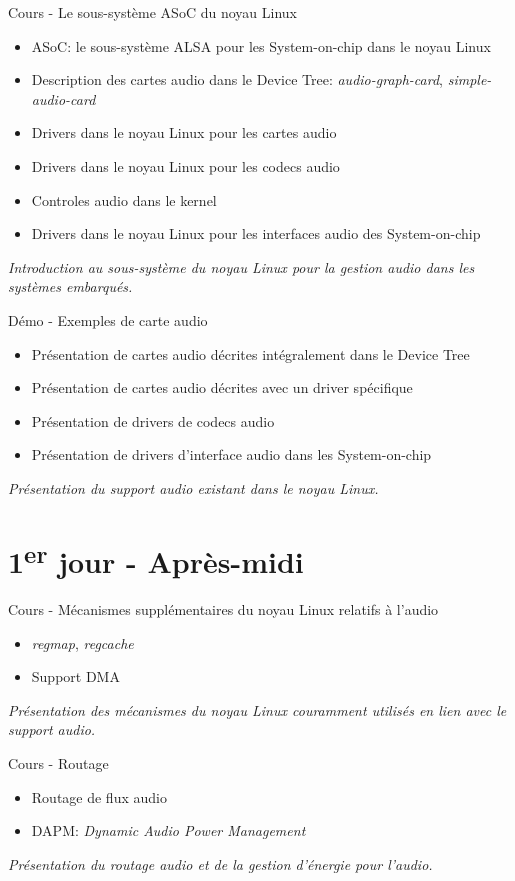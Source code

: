 \documentclass[a4paper,12pt,obeyspaces,spaces,hyphens]{article}
\begin{document}
\feagendatwocolumn
{Cours - Le sous-système ASoC du noyau Linux}
{
  \begin{itemize}
  \item ASoC: le sous-système ALSA pour les System-on-chip dans le noyau Linux
  \item Description des cartes audio dans le Device Tree: {\em
      audio-graph-card}, {\em simple-audio-card}
  \item Drivers dans le noyau Linux pour les cartes audio
  \item Drivers dans le noyau Linux pour les codecs audio
  \item Controles audio dans le kernel
  \item Drivers dans le noyau Linux pour les interfaces audio des
    System-on-chip
  \end{itemize}
  \vspace{0.5em}
  {\em Introduction au sous-système du noyau Linux pour la gestion audio dans les systèmes embarqués.}
}
{Démo - Exemples de carte audio}
{
  \begin{itemize}
  \item Présentation de cartes audio décrites intégralement dans le Device Tree
  \item Présentation de cartes audio décrites avec un driver spécifique
  \item Présentation de drivers de codecs audio
  \item Présentation de drivers d'interface audio dans les
    System-on-chip
  \end{itemize}
  \vspace{0.5em}
  {\em Présentation du support audio existant dans le noyau Linux.}
}

\section{1\textsuperscript{er} jour - Après-midi}

\feagendatwocolumn
{Cours - Mécanismes supplémentaires du noyau Linux relatifs à l'audio}
{
  \begin{itemize}
  \item {\em regmap}, {\em regcache}
  \item Support DMA
  \end{itemize}
  \vspace{0.5em}
  {\em Présentation des mécanismes du noyau Linux couramment utilisés en lien avec le support audio.}
}
{Cours - Routage}
{
  \begin{itemize}
  \item Routage de flux audio
  \item DAPM: {\em Dynamic Audio Power Management}
  \end{itemize}
  \vspace{0.5em}
  {\em Présentation du routage audio et de la gestion d'énergie pour l'audio.}
}
\end{document}
